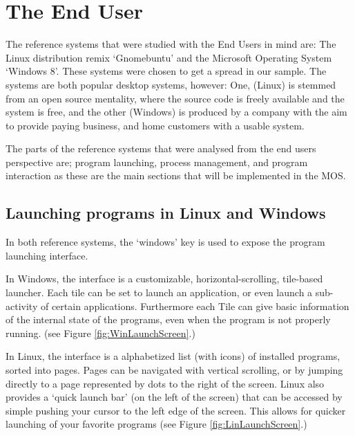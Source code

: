 \documentclass[a4paper]{report}
\begin{document}
\clearpage
\section{The End User}
The reference systems that were studied with the End Users in mind are: The Linux distribution remix `Gnomebuntu' and the Microsoft Operating System `Windows 8'. These systems were chosen to get a spread in our sample. The systems are both popular desktop systems, however: One, (Linux) is stemmed from an open source mentality, where the source code is freely available and the system is free, and the other (Windows) is produced by a company with the aim to provide paying business, and home customers with a usable system.

The parts of the reference systems that were analysed from the end users perspective are; program launching, process management, and program interaction as these are the main sections that will be implemented in the MOS.

\subsection{Launching programs in Linux and Windows}

In both reference systems, the `windows' key is used to expose the program launching interface.

In Windows, the interface is a customizable, horizontal-scrolling, tile-based launcher. Each tile can be set to launch an application, or even launch a sub-activity of certain applications. Furthermore each Tile can give basic information of the internal state of the programs, even when the program is not properly running. (see Figure \ref{fig:WinLaunchScreen}.)


In Linux, the interface is a alphabetized list (with icons) of installed programs, sorted into pages. Pages can be navigated with vertical scrolling, or by jumping directly to a page represented by dots to the right of the screen. Linux also provides a `quick launch bar' (on the left of the screen) that can be accessed by simple pushing your cursor to the left edge of the screen. This allows for quicker launching of your favorite programs (see Figure \ref{fig:LinLaunchScreen}.)
\end{document}
